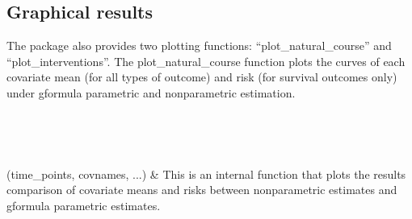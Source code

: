 \documentclass[letterpaper,10pt,english]{sphinxmanual}
\begin{document}
\subsection{Graphical results}
\label{\detokenize{Specifications/Output:module-pygformula.plot}}\label{\detokenize{Specifications/Output:graphical-results}}
\sphinxAtStartPar
The package also provides two plotting functions: “plot\_natural\_course” and “plot\_interventions”.
The plot\_natural\_course function plots the curves of each covariate mean (for all types of outcome) and risk (for survival outcomes only) under g\sphinxhyphen{}formula parametric and
non\sphinxhyphen{}parametric estimation.


\begin{savenotes}\sphinxatlongtablestart\begin{longtable}[c]{}
\hline

\endfirsthead

%
{}\\
\hline

\endhead

\hline
{}\\
\endfoot

\endlastfoot

\sphinxAtStartPar
{\hyperref[\detokenize{Specifications/Output:pygformula.plot.plot_natural_course}]{}}(time\_points, covnames, ...)
&
\sphinxAtStartPar
This is an internal function that plots the results comparison of covariate means and risks between non\sphinxhyphen{}parametric estimates and g\sphinxhyphen{}formula parametric estimates.
\\
\hline
\end{longtable}\sphinxatlongtableend\end{savenotes}
\end{document}

